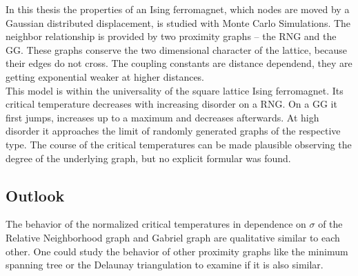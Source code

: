 In this thesis the properties of an Ising ferromagnet, which nodes are
moved by a Gaussian distributed displacement, is studied with Monte Carlo
Simulations. The neighbor relationship is provided by two proximity graphs
-- the RNG and the GG. These graphs conserve the two dimensional character
of the lattice, because their edges do not cross. The coupling constants
are distance dependend, they are getting exponential weaker at higher distances.\\
This model is within the universality of the square lattice Ising
ferromagnet. Its critical temperature decreases with increasing disorder
on a RNG. On a GG it first jumps, increases up to a maximum and decreases
afterwards. At high disorder it approaches the limit of randomly generated
graphs of the respective type. The course of the critical temperatures
can be made plausible observing the degree of the underlying graph, but
no explicit formular was found.

\subsection{Outlook}
    The behavior of the normalized critical temperatures in dependence
    on \(\sigma\) of the Relative Neighborhood graph and Gabriel graph
    are qualitative similar to each other. One could study the behavior
    of other proximity graphs like the minimum spanning tree or the
    Delaunay triangulation to examine if it is also similar.\\
